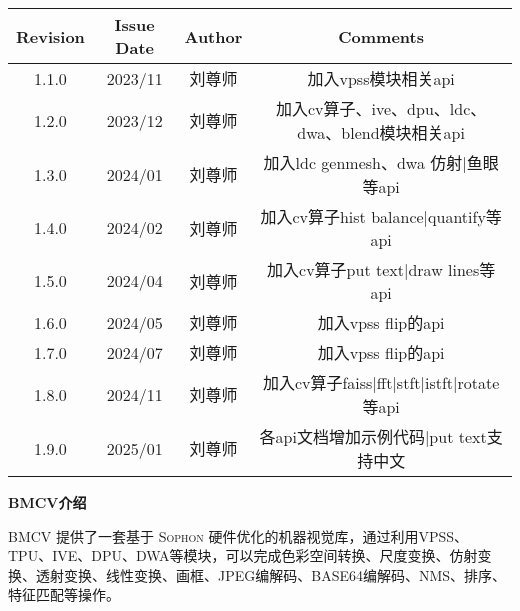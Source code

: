 \begin{center}
    \begin{table}[htb]
    \begin{adjustbox}{width=1\textwidth}
    \begin{tabular}{|>{\normalsize}c|>{\normalsize}c|>{\normalsize}c|>{\normalsize}c|}
    \hline
    \rowcolor[HTML]{C0C0C0}
    \textbf{Revision} & \textbf{Issue Date} & \textbf{Author} & \textbf{Comments}  \\ \hline
    1.1.0             & 2023/11             & 刘尊师             & 加入vpss模块相关api \\ \hline
    1.2.0             & 2023/12             & 刘尊师             & 加入cv算子、ive、dpu、ldc、dwa、blend模块相关api \\ \hline
    1.3.0             & 2024/01             & 刘尊师             & 加入ldc genmesh、dwa 仿射|鱼眼等api \\ \hline
    1.4.0             & 2024/02             & 刘尊师             & 加入cv算子hist balance|quantify等api \\ \hline
    1.5.0             & 2024/04             & 刘尊师             & 加入cv算子put text|draw lines等api \\ \hline
    1.6.0             & 2024/05             & 刘尊师             & 加入vpss flip的api \\ \hline
    1.7.0             & 2024/07             & 刘尊师             & 加入vpss flip的api \\ \hline
    1.8.0             & 2024/11             & 刘尊师             & 加入cv算子faiss|fft|stft|istft|rotate等api \\ \hline
    1.9.0             & 2025/01             & 刘尊师             & 各api文档增加示例代码|put text支持中文 \\ \hline
    \end{tabular}
    \end{adjustbox}
    \end{table}
\end{center}
\newpage
\thispagestyle{normal}
\begin{center}
    \Large \textbf{BMCV介绍}
    \vspace*{0.5cm}
\end{center}

\begin{flushleft}
    \normalsize \textsc{BMCV 提供了一套基于 Sophon 硬件优化的机器视觉库，通过利用VPSS、TPU、IVE、DPU、DWA等模块，可以完成色彩空间转换、尺度变换、仿射变换、透射变换、线性变换、画框、JPEG编解码、BASE64编解码、NMS、排序、特征匹配等操作。}\tabularnewline
\end{flushleft}

\newpage
